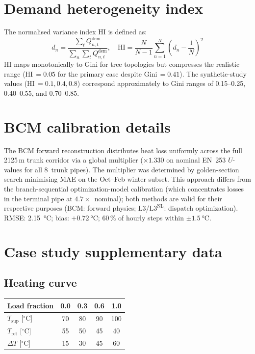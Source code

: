 \documentclass[a4paper,fleqn]{cas-dc}
\newcommand{\Lnl}{\mathrm{L3}^{\mathrm{NL}}}
\begin{document}
\section{Demand heterogeneity index}
\label{app:hi_definition}

The normalised variance index HI is defined as:
\begin{equation}
  d_n = \frac{\sum_t Q_{n,t}^{\mathrm{dem}}}{\sum_n \sum_t
    Q_{n,t}^{\mathrm{dem}}},
  \quad
  \mathrm{HI} = \frac{N}{N{-}1} \sum_{n=1}^{N}
    \left(d_n - \frac{1}{N}\right)^{\!2}
  \label{eq:hi}
\end{equation}
HI maps monotonically to Gini for tree topologies but compresses
the realistic range (HI\,$= 0.05$ for the primary case despite
Gini\,$= 0.41$). The synthetic-study values
(HI\,$= 0.1, 0.4, 0.8$) correspond approximately to Gini ranges
of 0.15--0.25, 0.40--0.55, and 0.70--0.85.

\section{BCM calibration details}
\label{app:bcm_calibration}

The BCM forward reconstruction distributes heat loss uniformly
across the full 2125\,m trunk corridor via a global multiplier
(${\times}1.330$ on nominal EN~253 $U$-values for all 8~trunk
pipes). The multiplier was determined by golden-section search
minimising MAE on the Oct--Feb winter subset. This approach
differs from the branch-sequential optimization-model calibration
(which concentrates losses in the terminal pipe at
$4.7{\times}$~nominal); both methods are valid for their
respective purposes (BCM: forward physics; L3/$\Lnl$: dispatch
optimization). RMSE: \SI{2.15}{\celsius}; bias:
${+}\SI{0.72}{\celsius}$; 60\,\% of hourly steps within
${\pm}\SI{1.5}{\celsius}$.

\section{Case study supplementary data}
\label{app:case_data}

\subsection{Heating curve}
\label{app:heating_curve}

\noindent
{}
\label{tab:pwl}
\centering
\footnotesize
\begin{tabular*}{\columnwidth}{@{\extracolsep{\fill}} l c c c c @{}}
\toprule
Load fraction & 0.0 & 0.3 & 0.6 & 1.0 \\
\midrule
$T_{\mathrm{sup}}$ [$^\circ$C] & 70 & 80 & 90 & 100 \\
$T_{\mathrm{ret}}$ [$^\circ$C] & 55 & 50 & 45 & 40 \\
$\Delta T$ [$^\circ$C]         & 15 & 30 & 45 & 60 \\
\bottomrule
\end{tabular*}
\bigskip
\end{document}
